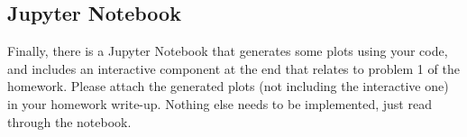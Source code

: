 \documentclass[12pt]{article}
\newcommand{\0}{\mathbf{0}}
\begin{document}
\subsection{Jupyter Notebook}
Finally, there is a Jupyter Notebook that generates some plots using your code, and includes an interactive component at the end that relates to problem 1 of the homework.
Please attach the generated plots (not including the interactive one) in your homework write-up.
Nothing else needs to be implemented, just read through the notebook.

%
%
\end{document}
